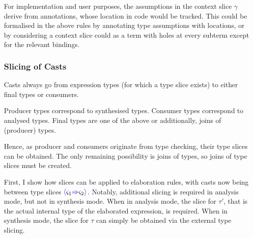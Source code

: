 For implementation and user purposes, the assumptions in the context slice $\gamma$ derive from annotations, whose location in code would be tracked. This could be formalised in the above rules by annotating type assumptions with locations, or by considering a context slice could as a term with holes at every subterm except for the relevant bindings.\par 
 

\subsubsection{Slicing of Casts}
Casts always go from expression types (for which a type slice exists) to either final types or consumers.\par 
Producer types correspond to synthesised types. Consumer types correspond to analysed types. Final types are one of the above or additionally, joins of (producer) types.\par 
\par 
Hence, as producer and consumers originate from type checking, their type slices can be obtained. The only remaining possibility is joins of types, so joins of type slices must be created.\par 
First, I show how slices can be applied to elaboration rules, with casts now being between type slices ${\color{blue}\langle} \varsigma_1 {\color{blue}\Rightarrow} \varsigma_2 {\color{blue}\rangle}$. Notably, additional slicing is required in analysis mode, but not in synthesis mode. When in analysis mode, the slice for $\tau'$, that is the actual internal type of the elaborated expression, is required. When in synthesis mode, the slice for $\tau$ can simply be obtained via the external type slicing. 

